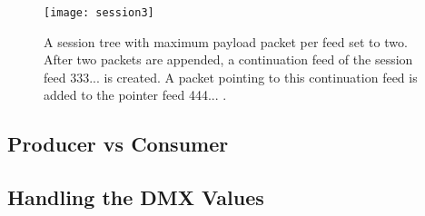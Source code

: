 \begin{figure}
\centering
\texttt{[image: session3]}
\caption{A session tree with maximum payload packet per feed set to two. After two packets are appended, a continuation feed of the session feed 333... is created. A packet pointing to this continuation feed is added to the pointer feed 444... .}
\label{fig:session3}
\end{figure}

\subsection{Producer vs Consumer}

\subsection{Handling the DMX Values}
